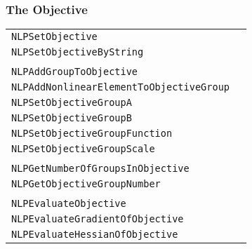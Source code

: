 \documentclass[12pt]{article}
\begin{document}
\newpage

\subsubsection{The Objective}

\begin{center}
\begin{tabular}{ll}
\tt NLPSetObjective&\pageref{Subroutine:NLPSetObjective}\\
\tt NLPSetObjectiveByString&\pageref{Subroutine:NLPSetObjectiveByString}\\
\\
\tt NLPAddGroupToObjective&\pageref{Subroutine:NLPAddGroupToObjective}\\
\tt NLPAddNonlinearElementToObjectiveGroup&\pageref{Subroutine:NLPAddNonlinearElementToObjectiveGroup}\\
\tt NLPSetObjectiveGroupA&\pageref{Subroutine:NLPSetObjectiveGroupA}\\
\tt NLPSetObjectiveGroupB&\pageref{Subroutine:NLPSetObjectiveGroupB}\\
\tt NLPSetObjectiveGroupFunction&\pageref{Subroutine:NLPSetObjectiveGroupFunction}\\
\tt NLPSetObjectiveGroupScale&\pageref{Subroutine:NLPSetObjectiveGroupScale}\\
\\
\tt NLPGetNumberOfGroupsInObjective&\pageref{Subroutine:NLPGetNumberOfGroupsInObjective}\\
\tt NLPGetObjectiveGroupNumber&\pageref{Subroutine:NLPGetObjectiveGroupNumber}\\
\\
\tt NLPEvaluateObjective&\pageref{Subroutine:NLPEvaluateObjective}\\
\tt NLPEvaluateGradientOfObjective&\pageref{Subroutine:NLPEvaluateGradientOfObjective}\\
\tt NLPEvaluateHessianOfObjective&\pageref{Subroutine:NLPEvaluateHessianOfObjective}\\
\end{tabular}
\end{center}
\end{document}
